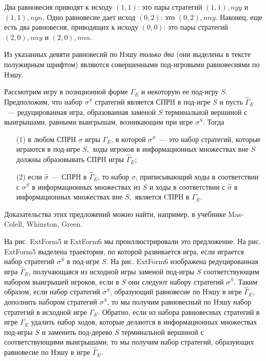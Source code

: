 Два равновесия приводят к исходу $(1,1)$: это пары стратегий
\textbf{$(1,1), nyy$} и $(1,1), nyn$.
Одно равновесие дает исход $(0,2)$: это $(0,2), nny$. Наконец, еще
есть два равновесия, приводящих к исходу $(0,0)$: это пары стратегий
$(2,0), nny$ и $(2,0), nnn$.

Из указанных девяти равновесий по Нэшу \emph{только два} (они выделены в тексте
полужирным шрифтом) являются совершенными под-игровыми равновесиями по Нэшу.



\begin{proposition}
Рассмотрим игру в позиционной форме $\Gamma_E$ и некоторую ее
под-игру $S$.  Предположим, что набор $\sigma^S$ стратегий является
СПРH в под-игре $S$ и пусть $\widehat\Gamma_E$~--- редуцированная
игра, образованная заменой $S$ терминальной вершиной с выигрышами,
равными выигрышам, возникающим при игре $\sigma^S.$ Тогда
\begin{itemize}
\item[(1)] в любом СПРH $\sigma$ игры $\Gamma_E$, в которой
$\sigma^S$~--- это набор стратегий, которые играются в под-игре $S,$
ходы игроков в информационных множествах вне $S$ должны образовывать
СПРH  игры $\widehat\Gamma_E$;
\item[(2)]  если $\hat\sigma$~--- СПРH в $\widehat\Gamma_E$, то
набор $\sigma$, приписывающий ходы в соответствии с $\sigma^S$ в
информационных множествах из $S$ и ходы в соответствии с $\hat
\sigma$  в информационных множествах вне $S,$ является CПРH в
$\Gamma_E$.
\end{itemize}
\end{proposition}

Доказательства этих предложений можно  найти, например, в учебнике
Mas-Colell, Whinston, Green.

На рис. ExtForm5 и ExtForm6 мы проиллюстрировали это предложение.
На рис. ExtForm5 выделена траектория, по которой развивается игра, если
играется набор стратегий $\sigma^S$ в под-игре $S$. На рис. ExtForm6 изображена
редуцированная игра $\widehat\Gamma_E$, получающаяся из исходной игры заменой
под-игры $S$ соответствующим набором выигрышей игроков, если в $S$ они следуют
набору стратегий $\sigma^S$. Таким образом, если набор стратегий $\sigma^S$,
образующий равновесие по Нэшу в игре $\widehat\Gamma_E$, дополнить набором
стратегий $\sigma^S$, то мы получим равновесный по Нэшу набор стратегий в
исходной игре $\Gamma_E$. Обратно, если из набора равновесных стратегий в игре
$\Gamma_E$ удалить набор ходов, которые делаются в информационных множествах
под-игры $S$ и заменить под-дерево $S$ терминальной вершиной с соответствующими
выигрышами, то мы получим набор стратегий, образующих равновесие по Нэшу в игре
$\widehat\Gamma_E$.


